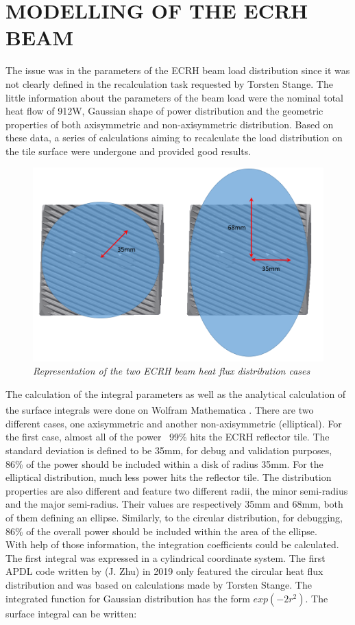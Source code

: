 \section{MODELLING OF THE ECRH BEAM}
\normalsize{The issue was in the parameters of the \acrshort{ECRH} beam load distribution since it was not clearly defined in the recalculation task requested by Torsten Stange. The little information about the parameters of the beam load were the nominal total heat flow of 912W, Gaussian shape of power distribution and the geometric properties of both axisymmetric and non-axisymmetric distribution. Based on these data, a series of calculations aiming to recalculate the load distribution on the tile surface  were undergone and provided good results.}
\begin{figure}[h!]
    \label{fig_4_1} 
    \centering
    \includegraphics[width=.9\textwidth]{figures/TWOBEAMDISTRI.png}
    \caption{\it Representation of the two ECRH beam heat flux distribution cases}
\end{figure}
\normalsize{\indent The calculation of the integral parameters as well as the analytical calculation of the surface integrals were done on Wolfram Mathematica\textsuperscript{\textregistered} . There are two different cases, one axisymmetric and another non-axisymmetric (elliptical). For the first case, almost all of the power ~99\% hits the ECRH reflector tile. The standard deviation is defined to be 35mm, for debug and validation purposes, 86\% of the power should be included within a disk of radius 35mm. For the elliptical distribution, much less power hits the reflector tile. The distribution properties are also different and feature two different radii, the minor semi-radius and the major semi-radius. Their values are respectively 35mm and 68mm, both of them defining an ellipse. Similarly, to the circular distribution, for debugging, 86\% of the overall power should be included within the area of the ellipse.}
\\
\break
\normalsize{\indent With help of those information, the integration coefficients could be calculated. The first integral was expressed in a cylindrical coordinate system. The first APDL code written by (J. Zhu) in 2019 only featured the circular heat flux distribution and was based on calculations made by Torsten Stange. The integrated function for Gaussian distribution has the form $exp(-2r^2)$. The surface integral can be written:}